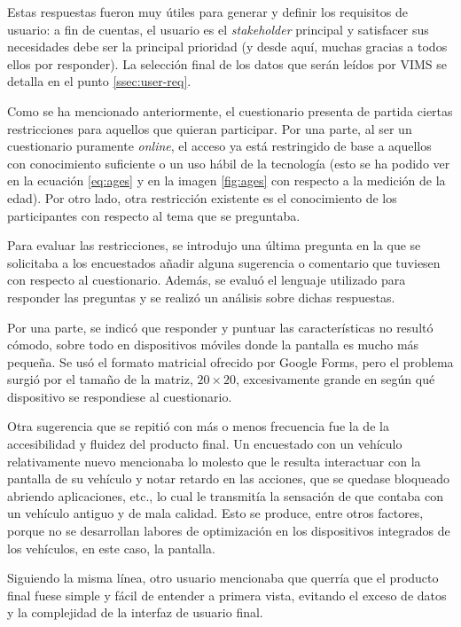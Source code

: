 Estas respuestas fueron muy útiles para generar y definir los requisitos de usuario:
a fin de cuentas, el usuario es el \textit{stakeholder} principal y satisfacer sus
necesidades debe ser la principal prioridad (y desde aquí, muchas gracias a todos
ellos por responder). La selección final de los datos que serán leídos
por \ac{VIMS} se detalla en el punto \ref{ssec:user-req}.

Como se ha mencionado anteriormente, el cuestionario presenta de partida ciertas
restricciones para aquellos que quieran participar. Por una parte, al ser un cuestionario
puramente \textit{online}, el acceso ya está restringido de base a aquellos con
conocimiento suficiente o un uso hábil de la tecnología (esto se ha podido ver
en la ecuación \ref{eq:ages} y en la imagen \ref{fig:ages} con respecto a la medición
de la edad). Por otro lado, otra restricción existente es el conocimiento de los
participantes con respecto al tema que se preguntaba.

Para evaluar las restricciones, se introdujo una última pregunta en la que se
solicitaba a los encuestados añadir alguna sugerencia o comentario que tuviesen con
respecto al cuestionario. Además, se evaluó el lenguaje utilizado para responder las
preguntas y se realizó un análisis sobre dichas respuestas.

Por una parte, se indicó que responder y puntuar las características no resultó
cómodo, sobre todo en dispositivos móviles donde la pantalla es mucho más pequeña.
Se usó el formato matricial ofrecido por Google Forms, pero el problema surgió
por el tamaño de la matriz, $20 \times 20$, excesivamente grande en según qué
dispositivo se respondiese al cuestionario.

Otra sugerencia que se repitió con más o menos frecuencia fue la de la accesibilidad
y fluidez del producto final. Un encuestado con un vehículo relativamente nuevo
mencionaba lo molesto que le resulta interactuar con la pantalla de su vehículo y notar
retardo en las acciones, que se quedase bloqueado abriendo aplicaciones, etc., lo cual
le transmitía la sensación de que contaba con un vehículo antiguo y de mala calidad.
Esto se produce, entre otros factores, porque no se desarrollan labores de optimización
en los dispositivos integrados de los vehículos, en este caso, la pantalla.

Siguiendo la misma línea, otro usuario mencionaba que querría que el producto final
fuese simple y fácil de entender a primera vista, evitando el exceso de datos y la
complejidad de la interfaz de usuario final.

